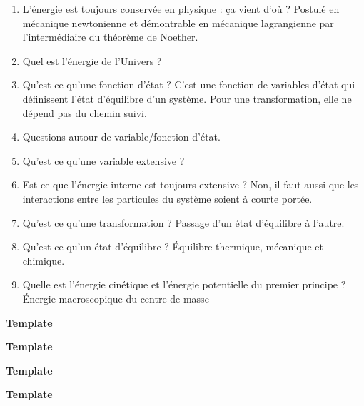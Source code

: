 \begin{enumerate}
\item L'énergie est toujours conservée en physique : ça vient d'où ? Postulé en mécanique newtonienne et démontrable en mécanique lagrangienne par l'intermédiaire du théorème de Noether.
\item Quel est l'énergie de l'Univers ?
\item Qu'est ce qu'une fonction d'état ? C'est une fonction de variables d'état qui définissent l'état d'équilibre d'un système. Pour une transformation, elle ne dépend pas du chemin suivi.
\item Questions autour de variable/fonction d'état.
\item Qu'est ce qu'une variable extensive ?
\item Est ce que l'énergie interne est toujours extensive ? Non, il faut aussi que les interactions entre les particules du système soient à courte portée.
\item Qu'est ce qu'une transformation ? Passage d'un état d'équilibre à l'autre.
\item Qu'est ce qu'un état d'équilibre ? Équilibre thermique, mécanique et chimique.
\item Quelle est l'énergie cinétique et l'énergie potentielle du premier principe ? Énergie macroscopique du centre de masse
\end{enumerate}

\begin{experience}
\textbf{Template}
\end{experience}

\begin{slide}
\textbf{Template}
\end{slide}

\begin{transition}
\textbf{Template}
\end{transition}

\begin{remarque}
\textbf{Template}
\end{remarque}

\newpage
